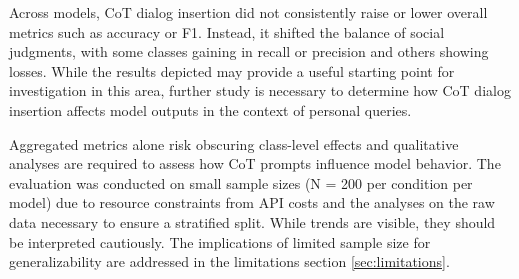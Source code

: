 Across models, CoT dialog insertion did not consistently raise or lower overall metrics such as accuracy or F1. Instead, it shifted the balance of social judgments, with some classes gaining in recall or precision and others showing losses. While the results depicted may provide a useful starting point for investigation in this area, further study is necessary to determine how CoT dialog insertion affects model outputs in the context of personal queries.


Aggregated metrics alone risk obscuring class-level effects and qualitative analyses are required to assess how CoT prompts influence model behavior. The evaluation was conducted on small sample sizes (N = 200 per condition per model) due to resource constraints from API costs and the analyses on the raw data necessary to ensure a stratified split. While trends are visible, they should be interpreted cautiously. The implications of limited sample size for generalizability are addressed in the limitations section \ref{sec:limitations}.


